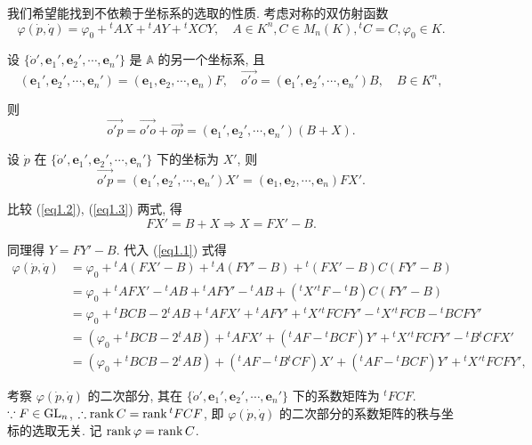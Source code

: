 \documentclass[color=black,device=normal,lang=cn,mode=geye]{elegantnote}
\begin{document}
我们希望能找到不依赖于坐标系的选取的性质. 考虑对称的双仿射函数
\begin{equation}\label{eq1.1}
    \varphi(\dot{p},\dot{q})=\varphi_0+{}^tAX+{}^tAY+{}^tXCY,\quad A\in K^n,C\in M_n(K),{}^tC=C,\varphi_0\in K.
\end{equation}

设 $\{\dot{o}',\boldsymbol{e}_1',\boldsymbol{e}_2',\cdots,\boldsymbol{e}_n'\}$ 是 $\mathbb{A}$ 的另一个坐标系, 且
\[(\boldsymbol{e}_1',\boldsymbol{e}_2',\cdots,\boldsymbol{e}_n')=(\boldsymbol{e}_1,\boldsymbol{e}_2,\cdots,\boldsymbol{e}_n)F,\quad\overrightarrow{o'o}=(\boldsymbol{e}_1',\boldsymbol{e}_2',\cdots,\boldsymbol{e}_n')B,\quad B\in K^n,\]

则
\begin{equation}\label{eq1.2}
    \overrightarrow{o'p}=\overrightarrow{o'o}+\overrightarrow{op}=(\boldsymbol{e}_1',\boldsymbol{e}_2',\cdots,\boldsymbol{e}_n')(B+X).
\end{equation}

设 $\dot{p}$ 在 $\{\dot{o}',\boldsymbol{e}_1',\boldsymbol{e}_2',\cdots,\boldsymbol{e}_n'\}$ 下的坐标为 $X'$, 则
\begin{equation}\label{eq1.3}
    \overrightarrow{o'p}=(\boldsymbol{e}_1',\boldsymbol{e}_2',\cdots,\boldsymbol{e}_n')X'=(\boldsymbol{e}_1,\boldsymbol{e}_2,\cdots,\boldsymbol{e}_n)FX'.
\end{equation}

比较 (\ref{eq1.2}), (\ref{eq1.3}) 两式, 得
\[FX'=B+X\Rightarrow X=FX'-B.\]

同理得 $Y=FY'-B$. 代入 (\ref{eq1.1}) 式得
\begin{align*}
    \varphi(\dot{p},\dot{q}) & =\varphi_0+{}^tA(FX'-B)+{}^tA(FY'-B)+{}^t(FX'-B)C(FY'-B) \\
    & =\varphi_0+{}^tAFX'-{}^tAB+{}^tAFY'-{}^tAB+({}^tX'{}^tF-{}^tB)C(FY'-B) \\
    & =\varphi_0+{}^tBCB-2{}^tAB+{}^tAFX'+{}^tAFY'+{}^tX'{}^tFCFY'-{}^tX'{}^tFCB-{}^tBCFY' \\
    & =(\varphi_0+{}^tBCB-2{}^tAB)+{}^tAFX'+({}^tAF-{}^tBCF)Y'+{}^tX'{}^tFCFY'-{}^tB{}^tCFX' \\
    & =(\varphi_0+{}^tBCB-2{}^tAB)+({}^tAF-{}^tB{}^tCF)X'+({}^tAF-{}^tBCF)Y'+{}^tX'{}^tFCFY',
\end{align*}

考察 $\varphi(\dot{p},\dot{q})$ 的二次部分, 其在 $\{\dot{o}',\boldsymbol{e}_1',\boldsymbol{e}_2',\cdots,\boldsymbol{e}_n'\}$ 下的系数矩阵为 ${}^tFCF$. $\because F\in\operatorname{GL} _n$, $\therefore\operatorname{rank} C=\operatorname{rank} {}^tFCF$, 即 $\varphi(\dot{p},\dot{q})$ 的二次部分的系数矩阵的秩与坐标的选取无关. 记 $\operatorname{rank} \varphi=\operatorname{rank} C$.
\end{document}
